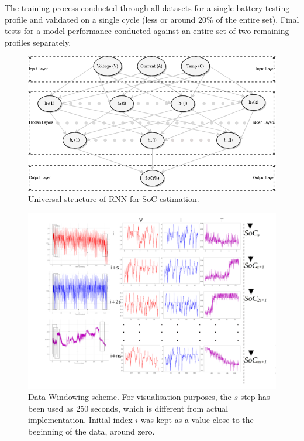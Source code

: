 %
%
The training process conducted through all datasets for a single battery testing profile and validated on a single cycle (less or around 20\% of the entire set).
Final tests for a model performance conducted against an entire set of two remaining profiles separately.
\begin{figure}[htbp]
    \centering
    \includegraphics[width=\linewidth]{II_Body/images/SoC-RNN.png}
    \caption{Universal structure of RNN for SoC estimation.}
    \label{fig:RNN-structure}
\end{figure}
\begin{landscape}
    \begin{figure}[ht]
        \centering
        \includegraphics[width=\linewidth]{II_Body/images/windowing3f-A3.jpg}
        \caption{Data Windowing scheme. For visualisation purposes, the $s$-step has been used as 250 seconds, which is different from actual implementation. Initial index $i$ was kept as a value close to the beginning of the data, around zero.}
        \label{fig:Windowing}
    \end{figure}
\end{landscape}
%
%
